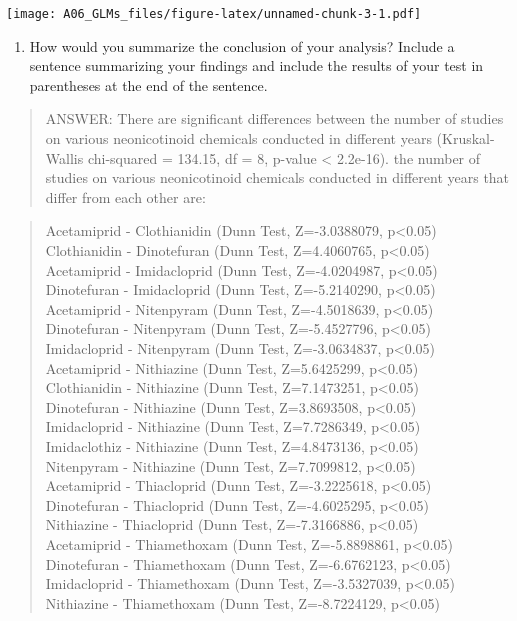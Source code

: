 \documentclass[]{article}
\providecommand{\tightlist}{%
  \setlength{\itemsep}{0pt}\setlength{\parskip}{0pt}}
\begin{document}
\texttt{[image: A06\_GLMs\_files/figure-latex/unnamed-chunk-3-1.pdf]}

\begin{enumerate}
\def\labelenumi{\arabic{enumi}.}
\setcounter{enumi}{8}
\tightlist
\item
  How would you summarize the conclusion of your analysis? Include a
  sentence summarizing your findings and include the results of your
  test in parentheses at the end of the sentence.
\end{enumerate}

\begin{quote}
ANSWER: There are significant differences between the number of studies
on various neonicotinoid chemicals conducted in different years
(Kruskal-Wallis chi-squared = 134.15, df = 8, p-value \textless{}
2.2e-16). the number of studies on various neonicotinoid chemicals
conducted in different years that differ from each other are:
\end{quote}

\begin{quote}
Acetamiprid - Clothianidin (Dunn Test, Z=-3.0388079, p\textless{}0.05)\\
Clothianidin - Dinotefuran (Dunn Test, Z=4.4060765, p\textless{}0.05)\\
Acetamiprid - Imidacloprid (Dunn Test, Z=-4.0204987, p\textless{}0.05)\\
Dinotefuran - Imidacloprid (Dunn Test, Z=-5.2140290, p\textless{}0.05)\\
Acetamiprid - Nitenpyram (Dunn Test, Z=-4.5018639, p\textless{}0.05)\\
Dinotefuran - Nitenpyram (Dunn Test, Z=-5.4527796, p\textless{}0.05)\\
Imidacloprid - Nitenpyram (Dunn Test, Z=-3.0634837, p\textless{}0.05)\\
Acetamiprid - Nithiazine (Dunn Test, Z=5.6425299, p\textless{}0.05)\\
Clothianidin - Nithiazine (Dunn Test, Z=7.1473251, p\textless{}0.05)\\
Dinotefuran - Nithiazine (Dunn Test, Z=3.8693508, p\textless{}0.05)\\
Imidacloprid - Nithiazine (Dunn Test, Z=7.7286349, p\textless{}0.05)\\
Imidaclothiz - Nithiazine (Dunn Test, Z=4.8473136, p\textless{}0.05)\\
Nitenpyram - Nithiazine (Dunn Test, Z=7.7099812, p\textless{}0.05)\\
Acetamiprid - Thiacloprid (Dunn Test, Z=-3.2225618, p\textless{}0.05)\\
Dinotefuran - Thiacloprid (Dunn Test, Z=-4.6025295, p\textless{}0.05)\\
Nithiazine - Thiacloprid (Dunn Test, Z=-7.3166886, p\textless{}0.05)\\
Acetamiprid - Thiamethoxam (Dunn Test, Z=-5.8898861, p\textless{}0.05)\\
Dinotefuran - Thiamethoxam (Dunn Test, Z=-6.6762123, p\textless{}0.05)\\
Imidacloprid - Thiamethoxam (Dunn Test, Z=-3.5327039,
p\textless{}0.05)\\
Nithiazine - Thiamethoxam (Dunn Test, Z=-8.7224129, p\textless{}0.05)
\end{quote}
\end{document}
